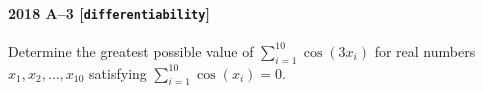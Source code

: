 \paragraph{2018 A--3 \textnormal{[\texttt{differentiability}]}}
Determine the greatest possible value of $\sum_{i=1}^{10} \cos(3x_i)$ for real numbers $x_1,x_2,\dots,x_{10}$
satisfying $\sum_{i=1}^{10} \cos(x_i) = 0$.
